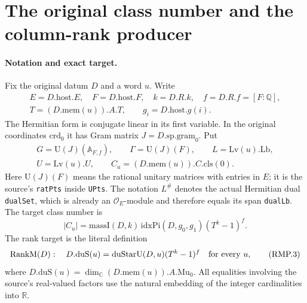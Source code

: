 \section{The original class number and the column-rank producer}
\label{sec:rank-producer}


\paragraph{Notation and exact target.}
Fix the original datum $D$ and a word $u$. Write
\[
 \begin{gathered}
 E=D.\mathrm{host}.E,\quad F=D.\mathrm{host}.F,\quad
 k=D.R.k,\quad f=D.R.f=[F:\mathbb Q],\\
 T=(D.\mathrm{mem}(u)).A.T,\qquad g_i=D.\mathrm{host}.g(i).
 \end{gathered}
\]
The Hermitian form is conjugate linear in its first variable.
In the original coordinates $\mathrm{crd}_0$ it has Gram matrix
$J=D.\mathrm{sp}.\mathrm{gram}_0$. Put
\[
 \begin{gathered}
 G=\mathrm U(J)(\mathbb A_{F,f}),\qquad
 \Gamma=\mathrm U(J)(F),\qquad L=\mathrm{Lv}(u).\mathrm{Lb},\\
 U=\mathrm{Lv}(u).U,\qquad C_u=(D.\mathrm{mem}(u)).C.\mathrm{cls}(0).
 \end{gathered}
                                                               \tag{RMP.1}
\]
Here $\mathrm U(J)(F)$ means the rational unitary matrices with entries
in $E$; it is the source's \texttt{ratPts} inside \texttt{UPts}.
The notation $L^{\#}$ denotes the actual Hermitian dual
\texttt{dualSet}, which is already an $\mathcal O_E$-module and
therefore equals its span \texttt{dualLb}.
The target class number is
\[
 |C_u|=\mathrm{massI}(D,k)\,
       \mathrm{idxPi}(D,g_0,g_1)(T^k-1)^f.              \tag{RMP.2}
\]
The rank target is the literal definition
\[
 \mathrm{RankM}(D):\quad
 D.\mathrm{duS}(u)=\mathrm{duStarU}(D,u)(T^k-1)^f
       \quad\hbox{for every }u,                        \tag{RMP.3}
\]
where $D.\mathrm{duS}(u)=\dim_{\mathbb C}(D.\mathrm{mem}(u)).A.\mathrm{Mu}_0$.
All equalities involving the source's real-valued factors use the
natural embedding of the integer cardinalities into $\mathbb R$.

